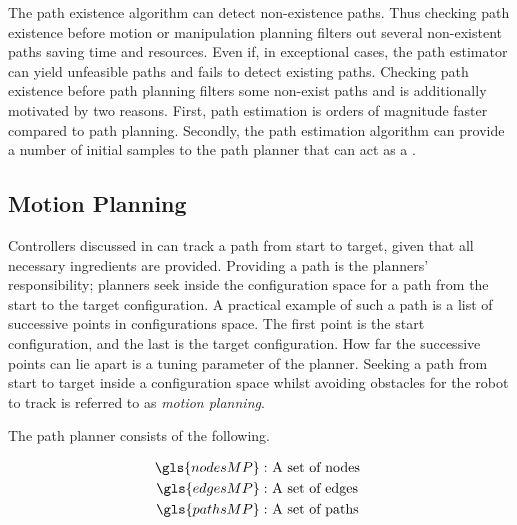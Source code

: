 
The path existence algorithm can detect non-existence paths. Thus checking path existence before motion or manipulation planning filters out several non-existent paths saving time and resources. Even if, in exceptional cases, the path estimator can yield unfeasible paths and fails to detect existing paths. Checking path existence before path planning filters some non-exist paths and is additionally motivated by two reasons. First, path estimation is orders of magnitude faster compared to path planning. Secondly, the path estimation algorithm can provide a number of initial samples to the path planner that can act as a .


\subsection{Motion Planning}%
\label{subsec:motion_planning}
Controllers discussed in  can track a path from start to target, given that all necessary ingredients are provided. Providing a path is the planners' responsibility; planners seek inside the configuration space for a path from the start to the target configuration. A practical example of such a path is a list of successive points in configurations space. The first point is the start configuration, and the last is the target configuration. How far the successive points can lie apart is a tuning parameter of the planner. Seeking a path from start to target inside a configuration space whilst avoiding obstacles for the robot to track is referred to as \textit{motion planning}.\bs

\textit{}\bs



 The path planner consists of the following.\bs

\begin{center}
\begin{align*}
  \gls{nodesMP}:& \textrm{ A set of nodes }\\
  \gls{edgesMP}:& \textrm{ A set of edges }\\
  \gls{pathsMP}:& \textrm{ A set of paths }
\end{align*}
\end{center}




